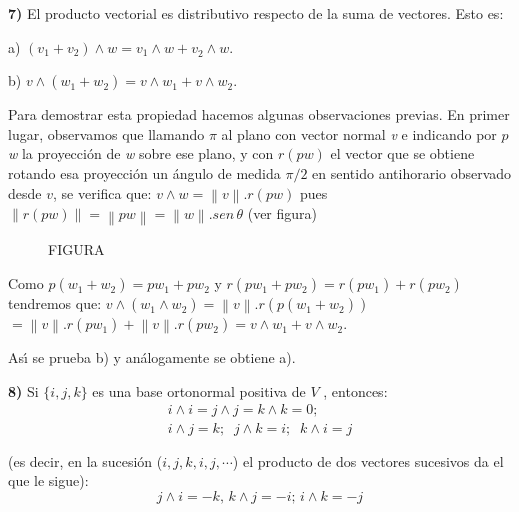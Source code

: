 \textbf{7) }El producto vectorial es distributivo respecto de la
suma de vectores. Esto es:

\noindent a) $\left( {v_1  + v_2 } \right) \wedge w = v_1 \wedge w
+ v_{2}^{}  \wedge w.$


\noindent b) $v \wedge \left( {w_{1}^{}  + w_{2}^{} } \right) = v
\wedge w_{1}^{}  + v \wedge w_{2}^{}. $

\noindent Para demostrar esta propiedad hacemos algunas
observaciones previas. En primer lugar, observamos que llamando
$\pi $ al plano con vector normal \textit{v }e indicando por $p $
\textit{w} la proyecci\'{o}n de \textit{w} sobre ese plano, y con
$r(p\textit{w})$ el vector que se obtiene rotando esa
proyecci\'{o}n un \'{a}ngulo de medida $\pi /2$ en sentido
antihorario observado desde $v$, se verifica que: $v \wedge w =
\left\| {v} \right\|.r\left( {pw} \right)$ pues
 $\left\| {r\left( {pw} \right)} \right\| = \left\| {pw} \right\| = \left\|
{w} \right\|.sen\,\theta $ (ver figura)

\begin{figure}[htb]
\centering
FIGURA
\end{figure}
%


\bigskip



\bigskip

Como $p\left( {w_{1}^{}  + w_{2}^{} } \right) = pw_{1}^{}  +
pw_{2}^{} $ y $r\left( {pw_{1}^{}  + pw_{2}^{} } \right) = r\left(
{pw_{1}^{} } \right) + r\left( {pw_{2}^{} } \right)$ tendremos
que: $v \wedge \left( {w_{1}^{} \wedge w_{2}^{} } \right) =
\left\| {v} \right\|.r\left( {p\left( {w_{1}^{} + w_{2}^{} }
\right)} \right)$$ = \left\| {v} \right\|.r\left( {pw_{1}^{} }
\right) + \left\| {v} \right\|.r\left( {pw_{2}^{} } \right) = v
\wedge w_{1}^{}  + v \wedge w_{2}^{} $.


As\'{\i} se prueba b) y an\'{a}logamente se obtiene a).

\textbf{8) }Si $ \{i,j,k\}$ es una base ortonormal positiva de $V$
, entonces:
\[
{\begin{array}{l}
 i \wedge i = j \wedge j = k \wedge k = 0; \\
 i \wedge j = k;\;\;j \wedge k = i;\;\;k \wedge i = j \\
  \\
 \end{array}}
\]
(es decir, en la sucesi\'{o}n ($i,j,k,i,j, \cdots$) el producto de
dos vectores sucesivos da el que le sigue):
\[
j \wedge i =  - k,\,k \wedge j =  - i;\,i \wedge k =  - j
\]

